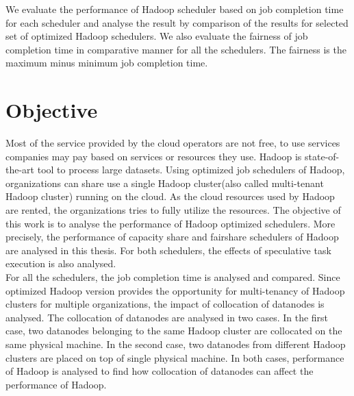 We evaluate the performance of Hadoop scheduler based on job completion time for each scheduler and analyse the result by comparison of the results for selected set of optimized Hadoop schedulers. We also evaluate the fairness of job completion time in comparative manner for all the schedulers. The fairness is the maximum minus minimum job completion time. \\
 




\section{Objective}

  Most of the service provided by the cloud operators are not free, to use services companies may pay based on services or resources they use. Hadoop is state-of-the-art tool to process large datasets. Using optimized job schedulers of Hadoop, organizations can share use a single Hadoop cluster(also called multi-tenant Hadoop cluster) running on the cloud. As the cloud resources used by Hadoop are rented, the organizations tries to fully utilize the resources. The objective of this work is to analyse the performance of Hadoop optimized schedulers. More precisely, the performance of capacity share and fairshare schedulers of Hadoop are analysed in this thesis. For both schedulers, the effects of speculative task execution is also analysed.\\
 
 For all the schedulers, the job completion time is analysed and compared. Since optimized Hadoop version provides the  opportunity for multi-tenancy of Hadoop clusters for multiple organizations, the impact of collocation of datanodes is analysed. The collocation of datanodes are analysed in two cases. In the first case, two datanodes belonging to the same Hadoop cluster are collocated on the same physical machine. In the second case, two datanodes from different Hadoop clusters are placed on top of single physical machine. In both cases, performance of Hadoop is analysed to find how collocation of datanodes can affect the performance of Hadoop. \\  
 



